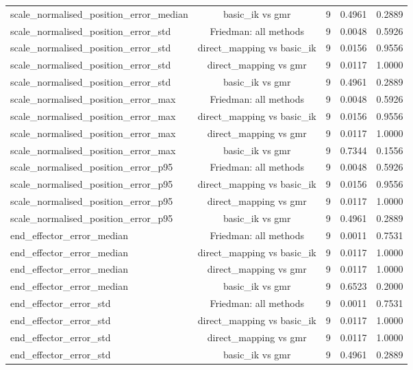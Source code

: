 \begin{table}[t]
{\begin{tabular}{lcccc}
scale\_normalised\_position\_error\_median & basic\_ik vs gmr & 9 & 0.4961 & 0.2889 \\
scale\_normalised\_position\_error\_std & Friedman: all methods & 9 & 0.0048 & 0.5926 \\
scale\_normalised\_position\_error\_std & direct\_mapping vs basic\_ik & 9 & 0.0156 & 0.9556 \\
scale\_normalised\_position\_error\_std & direct\_mapping vs gmr & 9 & 0.0117 & 1.0000 \\
scale\_normalised\_position\_error\_std & basic\_ik vs gmr & 9 & 0.4961 & 0.2889 \\
scale\_normalised\_position\_error\_max & Friedman: all methods & 9 & 0.0048 & 0.5926 \\
scale\_normalised\_position\_error\_max & direct\_mapping vs basic\_ik & 9 & 0.0156 & 0.9556 \\
scale\_normalised\_position\_error\_max & direct\_mapping vs gmr & 9 & 0.0117 & 1.0000 \\
scale\_normalised\_position\_error\_max & basic\_ik vs gmr & 9 & 0.7344 & 0.1556 \\
scale\_normalised\_position\_error\_p95 & Friedman: all methods & 9 & 0.0048 & 0.5926 \\
scale\_normalised\_position\_error\_p95 & direct\_mapping vs basic\_ik & 9 & 0.0156 & 0.9556 \\
scale\_normalised\_position\_error\_p95 & direct\_mapping vs gmr & 9 & 0.0117 & 1.0000 \\
scale\_normalised\_position\_error\_p95 & basic\_ik vs gmr & 9 & 0.4961 & 0.2889 \\
end\_effector\_error\_median & Friedman: all methods & 9 & 0.0011 & 0.7531 \\
end\_effector\_error\_median & direct\_mapping vs basic\_ik & 9 & 0.0117 & 1.0000 \\
end\_effector\_error\_median & direct\_mapping vs gmr & 9 & 0.0117 & 1.0000 \\
end\_effector\_error\_median & basic\_ik vs gmr & 9 & 0.6523 & 0.2000 \\
end\_effector\_error\_std & Friedman: all methods & 9 & 0.0011 & 0.7531 \\
end\_effector\_error\_std & direct\_mapping vs basic\_ik & 9 & 0.0117 & 1.0000 \\
end\_effector\_error\_std & direct\_mapping vs gmr & 9 & 0.0117 & 1.0000 \\
end\_effector\_error\_std & basic\_ik vs gmr & 9 & 0.4961 & 0.2889 \\

\end{tabular}}
\end{table}
